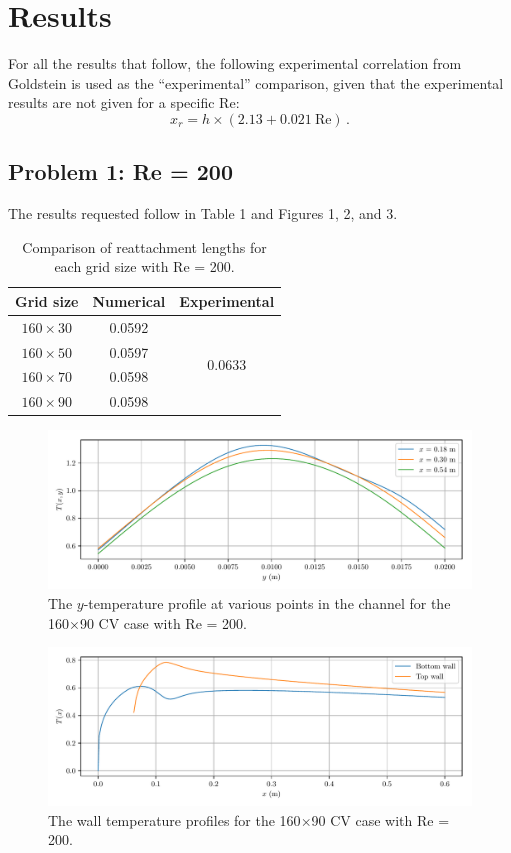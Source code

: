 \documentclass{article}
\begin{document}
\section{Results}

For all the results that follow, the following experimental correlation from Goldstein is used as the ``experimental'' comparison, given that the experimental results are not given for a specific Re:
\[
	x_r = h \times (2.13 + 0.021~\text{Re})\,.
\]

\subsection{Problem 1: Re = 200}

The results requested follow in Table 1 and Figures 1, 2, and 3.

\def\arraystretch{1.3}
\begin{table}[H]
	\small
	\centering
	\caption{Comparison of reattachment lengths for each grid size with Re = 200.}
	\vspace{0.2cm}
	\begin{tabular}{c|c|c}
		Grid size & Numerical & Experimental \\
		\hline
		$160\times30$ & 0.0592 & \multirow{4}{*}{0.0633} \\
		$160\times50$ & 0.0597 & \\
		$160\times70$ & 0.0598 & \\
		$160\times90$ & 0.0598 & \\
	\end{tabular}
	\label{table:b-temps}
\end{table}

\begin{figure}[H]
	\centering
	\includegraphics[width=0.9\linewidth]{../results/1a_Ty}
	\caption{The $y$-temperature profile at various points in the channel for the 160$\times$90 CV case with Re = 200.}
	\label{fig:1a_Ty}
\end{figure}

\begin{figure}[H]
	\centering
	\includegraphics[width=0.9\linewidth]{../results/1b_Twall}
	\caption{The wall temperature profiles for the 160$\times$90 CV case with Re = 200.}
	\label{fig:1b_Twall}
\end{figure}
\end{document}
